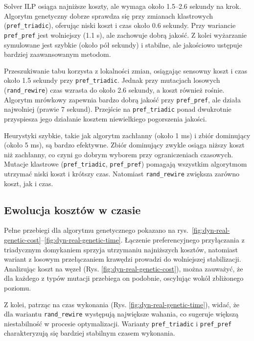 Solver ILP osiąga najniższe koszty, ale wymaga około 1.5--2.6 sekundy na krok. Algorytm genetyczny dobrze sprawdza się przy zmianach klastrowych (\texttt{pref\_triadic}), oferując niski koszt i czas około 0.6 sekundy. Przy wariancie \texttt{pref\_pref} jest wolniejszy (1.1 s), ale zachowuje dobrą jakość. Z kolei wyżarzanie symulowane jest szybkie (około pół sekundy) i stabilne, ale jakościowo ustępuje bardziej zaawansowanym metodom.

Przeszukiwanie tabu korzysta z lokalności zmian, osiągając sensowny koszt i czas około 1.5 sekundy przy \texttt{pref\_triadic}. Jednak przy mutacjach losowych (\texttt{rand\_rewire}) czas wzrasta do około 2.6 sekundy, a koszt również rośnie. Algorytm mrówkowy zapewnia bardzo dobrą jakość przy \texttt{pref\_pref}, ale działa najwolniej (prawie 7 sekund). Przejście na \texttt{pref\_triadic} ponad dwukrotnie przyspiesza jego działanie kosztem niewielkiego pogorszenia jakości.

Heurystyki szybkie, takie jak algorytm zachłanny (około 1 ms) i zbiór dominujący (około 5 ms), są bardzo efektywne. Zbiór dominujący zwykle osiąga niższy koszt niż zachłanny, co czyni go dobrym wyborem przy ograniczeniach czasowych. Mutacje klastrowe (\texttt{pref\_triadic}, \texttt{pref\_pref}) pomagają wszystkim algorytmom utrzymać niski koszt i krótszy czas. Natomiast \texttt{rand\_rewire} zwiększa zarówno koszt, jak i czas.


\subsection{Ewolucja kosztów w czasie}
Pełne przebiegi dla algorytmu genetycznego pokazano na rys.~\ref{fig:dyn-real-genetic-cost}--\ref{fig:dyn-real-genetic-time}. Łączenie preferencyjnego przyłączania z triadycznym domykaniem sprzyja utrzymaniu najniższych kosztów, natomiast wariant z losowym przełączaniem krawędzi prowadzi do wolniejszej stabilizacji. Analizując koszt na węzeł (Rys. \ref{fig:dyn-real-genetic-cost}), można zauważyć, że dla każdego z typów mutacji przebiega on podobnie, oscylując wokół zbliżonego poziomu.

Z kolei, patrząc na czas wykonania (Rys. \ref{fig:dyn-real-genetic-time}), widać, że dla wariantu \texttt{rand\_rewire} występują największe wahania, co sugeruje większą niestabilność w procesie optymalizacji. Warianty \texttt{pref\_triadic} i \texttt{pref\_pref} charakteryzują się bardziej stabilnym czasem wykonania.

